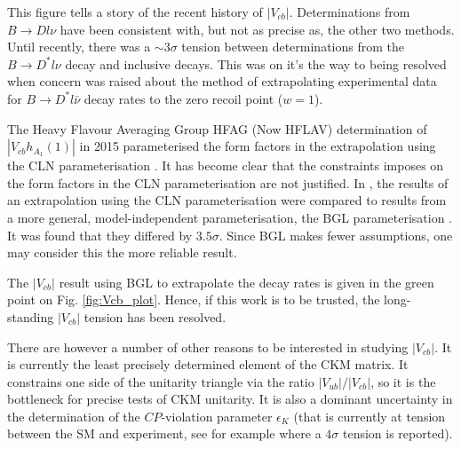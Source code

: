 This figure tells a story of the recent history of $|V_{cb}|$. Determinations from $B\to Dl\nu$ have been consistent with, but not as precise as, the other two methods. Until recently, there was a $\sim3\sigma$ tension between determinations from the $B\to D^* l\nu$ decay and inclusive decays. This was on it's the way to being resolved when concern was raised about the method of extrapolating experimental data for $B\to D^*l\bar{\nu}$ decay rates to the zero recoil point ($w=1$).

The Heavy Flavour Averaging Group HFAG (Now HFLAV) determination of $|V_{cb}h_{A_1}(1)|$ in 2015 parameterised the form factors in the extrapolation using the CLN parameterisation \cite{Caprini:1997mu}. It has become clear that the constraints imposes on the form factors in the CLN parameterisation are not justified. In \cite{Bigi:2017njr,Grinstein:2017nlq}, the results of an extrapolation using the CLN parameterisation were compared to results from a more general, model-independent parameterisation, the BGL parameterisation \cite{GLENNBOYD1996493}. It was found that they differed by $3.5\sigma$. Since BGL makes fewer assumptions, one may consider this the more reliable result.

The $|V_{cb}|$ result using BGL to extrapolate the decay rates is given in the green point on Fig. \ref{fig:Vcb_plot}. Hence, if this work is to be trusted, the long-standing $|V_{cb}|$ tension has been resolved.

There are however a number of other reasons to be interested in studying $|V_{cb}|$. It is currently the least precisely determined element of the CKM matrix. It constrains one side of the unitarity triangle via the ratio $|V_{ub}|/|V_{cb}|$, so it is the bottleneck for precise tests of CKM unitarity. It is also a dominant uncertainty in the determination of the $CP$-violation parameter $\epsilon_K$ (that is currently at tension between the SM and experiment, see for example \cite{Bailey:2018feb} where a $4\sigma$ tension is reported).


